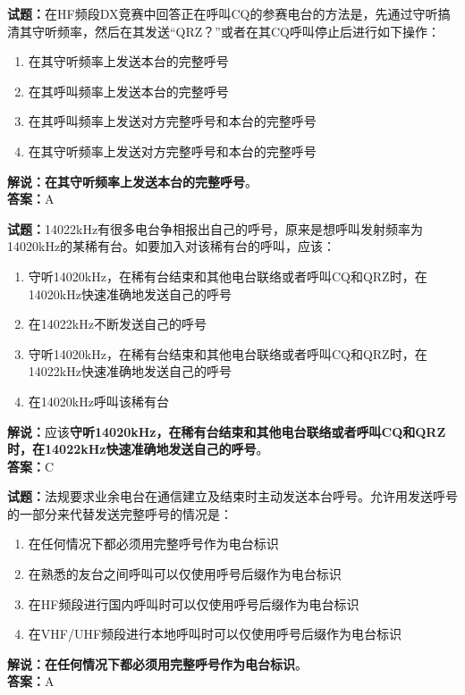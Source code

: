 \documentclass{ctexbook}
\begin{document}
\bigskip




\noindent\textbf{试题：}在HF频段DX竞赛中回答正在呼叫CQ的参赛电台的方法是，先通过守听搞清其守听频率，然后在其发送“QRZ？”或者在其CQ呼叫停止后进行如下操作：
\begin{enumerate}[leftmargin=3em]
\item 在其守听频率上发送本台的完整呼号
\item 在其呼叫频率上发送本台的完整呼号
\item 在其呼叫频率上发送对方完整呼号和本台的完整呼号
\item 在其守听频率上发送对方完整呼号和本台的完整呼号
\end{enumerate}
\noindent\textbf{解说：}\textbf{在其守听频率上发送本台的完整呼号}。\\\noindent\textbf{答案：}A

\bigskip




\noindent\textbf{试题：}14022\si{\kHz}有很多电台争相报出自己的呼号，原来是想呼叫发射频率为14020\si{\kHz}的某稀有台。如要加入对该稀有台的呼叫，应该：
\begin{enumerate}[leftmargin=3em]
\item 守听14020\si{\kHz}，在稀有台结束和其他电台联络或者呼叫CQ和QRZ时，在14020\si{\kHz}快速准确地发送自己的呼号
\item 在14022\si{\kHz}不断发送自己的呼号
\item 守听14020\si{\kHz}，在稀有台结束和其他电台联络或者呼叫CQ和QRZ时，在14022\si{\kHz}快速准确地发送自己的呼号
\item 在14020\si{\kHz}呼叫该稀有台
\end{enumerate}
\noindent\textbf{解说：}应该\textbf{守听14020\si{\kHz}，在稀有台结束和其他电台联络或者呼叫CQ和QRZ时，在14022\si{\kHz}快速准确地发送自己的呼号}。\\\noindent\textbf{答案：}C

\bigskip




\noindent\textbf{试题：}法规要求业余电台在通信建立及结束时主动发送本台呼号。允许用发送呼号的一部分来代替发送完整呼号的情况是：
\begin{enumerate}[leftmargin=3em]
\item 在任何情况下都必须用完整呼号作为电台标识
\item 在熟悉的友台之间呼叫可以仅使用呼号后缀作为电台标识
\item 在HF频段进行国内呼叫时可以仅使用呼号后缀作为电台标识
\item 在VHF/UHF频段进行本地呼叫时可以仅使用呼号后缀作为电台标识
\end{enumerate}
\noindent\textbf{解说：}\textbf{在任何情况下都必须用完整呼号作为电台标识}。\\\noindent\textbf{答案：}A
\end{document}
